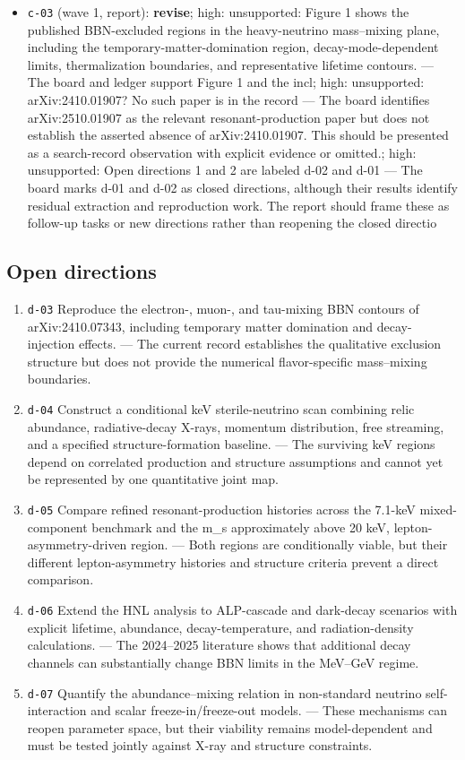 \documentclass[11pt,a4paper]{article}
\begin{document}
\begin{itemize}
  \item \texttt{c-03} (wave 1, report): \textbf{revise}; high: unsupported: Figure 1 shows the published BBN-excluded regions in the heavy-neutrino mass--mixing plane, including the temporary-matter-domination region, decay-mode-dependent limits, thermalization boundaries, and representative lifetime contours. --- The board and ledger support Figure 1 and the incl; high: unsupported: arXiv:2410.01907? No such paper is in the record --- The board identifies arXiv:2510.01907 as the relevant resonant-production paper but does not establish the asserted absence of arXiv:2410.01907. This should be presented as a search-record observation with explicit evidence or omitted.; high: unsupported: Open directions 1 and 2 are labeled d-02 and d-01 --- The board marks d-01 and d-02 as closed directions, although their results identify residual extraction and reproduction work. The report should frame these as follow-up tasks or new directions rather than reopening the closed directio
\end{itemize}
\subsection{Open directions}
\begin{enumerate}
  \item \texttt{d-03} Reproduce the electron-, muon-, and tau-mixing BBN contours of arXiv:2410.07343, including temporary matter domination and decay-injection effects. --- The current record establishes the qualitative exclusion structure but does not provide the numerical flavor-specific mass--mixing boundaries.
  \item \texttt{d-04} Construct a conditional keV sterile-neutrino scan combining relic abundance, radiative-decay X-rays, momentum distribution, free streaming, and a specified structure-formation baseline. --- The surviving keV regions depend on correlated production and structure assumptions and cannot yet be represented by one quantitative joint map.
  \item \texttt{d-05} Compare refined resonant-production histories across the 7.1-keV mixed-component benchmark and the m\_s approximately above 20 keV, lepton-asymmetry-driven region. --- Both regions are conditionally viable, but their different lepton-asymmetry histories and structure criteria prevent a direct comparison.
  \item \texttt{d-06} Extend the HNL analysis to ALP-cascade and dark-decay scenarios with explicit lifetime, abundance, decay-temperature, and radiation-density calculations. --- The 2024--2025 literature shows that additional decay channels can substantially change BBN limits in the MeV--GeV regime.
  \item \texttt{d-07} Quantify the abundance--mixing relation in non-standard neutrino self-interaction and scalar freeze-in/freeze-out models. --- These mechanisms can reopen parameter space, but their viability remains model-dependent and must be tested jointly against X-ray and structure constraints.
\end{enumerate}
\end{document}

